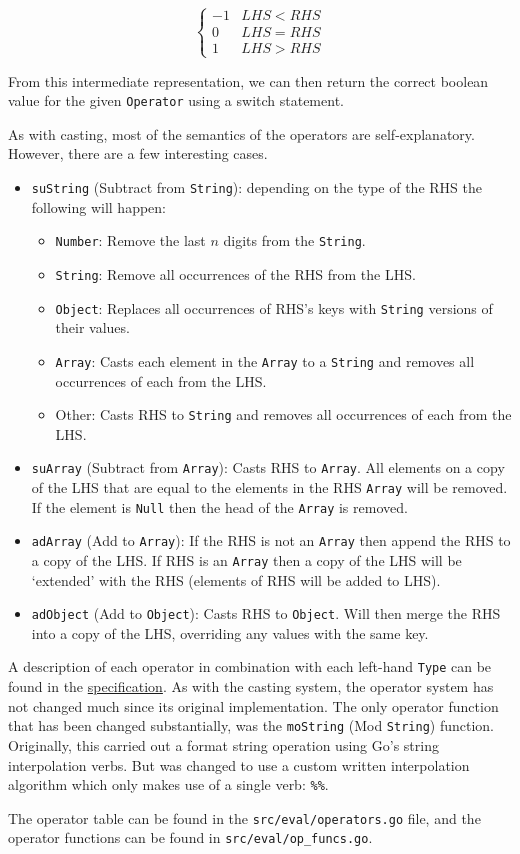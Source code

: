 \[ \begin{cases} 
    -1 & LHS < RHS \\
    0  & LHS = RHS \\
    1  & LHS > RHS 
 \end{cases}
\]

From this intermediate representation, we can then return the correct boolean value for the given \verb|Operator| using a switch statement.

As with casting, most of the semantics of the operators are self-explanatory. However, there are a few interesting cases.

\begin{itemize}
    \item \verb|suString| (Subtract from \verb|String|): depending on the type of the RHS the following will happen:
    \begin{itemize}
        \item \verb|Number|: Remove the last $n$ digits from the \verb|String|.
        \item \verb|String|: Remove all occurrences of the RHS from the LHS.
        \item \verb|Object|: Replaces all occurrences of RHS's keys with \verb|String| versions of their values.
        \item \verb|Array|: Casts each element in the \verb|Array| to a \verb|String| and removes all occurrences of each from the LHS.
        \item Other: Casts RHS to \verb|String| and removes all occurrences of each from the LHS.
    \end{itemize}
    \item \verb|suArray| (Subtract from \verb|Array|): Casts RHS to \verb|Array|. All elements on a copy of the LHS that are equal to the elements in the RHS \verb|Array| will be removed. If the element is \verb|Null| then the head of the \verb|Array| is removed.
    \item \verb|adArray| (Add to \verb|Array|): If the RHS is not an \verb|Array| then append the RHS to a copy of the LHS. If RHS is an \verb|Array| then a copy of the LHS will be `extended' with the RHS (elements of RHS will be added to LHS).
    \item \verb|adObject| (Add to \verb|Object|): Casts RHS to \verb|Object|. Will then merge the RHS into a copy of the LHS, overriding any values with the same key.
\end{itemize}

A description of each operator in combination with each left-hand \verb|Type| can be found in the \hyperref[sec:operatorvaluerel]{specification}. As with the casting system, the operator system has not changed much since its original implementation. The only operator function that has been changed substantially, was the \verb|moString| (Mod \verb|String|) function. Originally, this carried out a format string operation using Go's string interpolation verbs\textsuperscript{\cite{go_fmt_package}}. But was changed to use a custom written interpolation algorithm which only makes use of a single verb: \verb|%%|.

The operator table can be found in the \verb|src/eval/operators.go| file, and the operator functions can be found in \verb|src/eval/op_funcs.go|.
